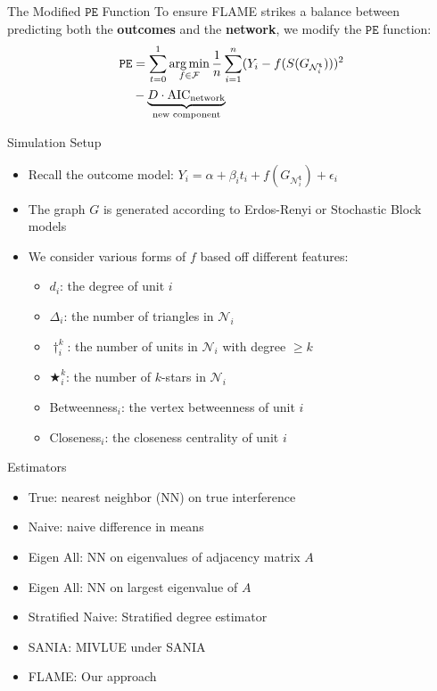 \documentclass[newPxFont,numfooter,sectionpages]{beamer}
\DeclareMathOperator*{\argmin}{arg\,min}
\newcommand{\bt}{\mathbf{t}}
\newcommand{\Gni}{G_{\mathcal{N}_i^\bt}}
\begin{document}
\begin{frame}{The Modified $\mathtt{PE}$ Function}
	To ensure FLAME strikes a balance between predicting both the \textbf{outcomes} and the \textbf{network}, we modify the $\mathtt{PE}$ function:
\begin{align*}
	{\tt PE} &= \sum_{t = 0}^1\argmin_{f \in \mathcal{F}}\frac{1}{n}\sum_{i = 1}^n(Y_i - f(S(\Gni)))^2\\
         &- \underbrace{D\cdot \text{AIC}_{\text{network}}}_{\text{new component}}
\end{align*}
\end{frame}

\begin{frame}{Simulation Setup}
	\begin{itemize}
		\item Recall the outcome model: $Y_i = \alpha + \beta_i t_i + f(G_{\mathcal{N}_i^\mathbf{t}}) + \epsilon_i$
		\item The graph $G$ is generated according to Erdos-Renyi or Stochastic Block models
		\item We consider various forms of $f$ based off different features:
		\begin{itemize}
			\item $d_i$: the degree of unit $i$
   			 \item $\Delta_i$: the number of triangles in $\mathcal{N}_i$
   			 \item $\dagger_i^k$: the number of units in $\mathcal{N}_i$ with degree $\geq k$
 			 \item $\bigstar_i^k$: the number of $k$-stars in $\mathcal{N}_i$
   			 \item Betweenness$_i$: the vertex betweenness of unit $i$
    			\item Closeness$_i$: the closeness centrality of unit $i$
		\end{itemize}
	\end{itemize}
\end{frame}
\begin{frame}{Estimators}
	\begin{itemize}
		\item True: nearest neighbor (NN) on true interference
		\item Naive: naive difference in means
		\item Eigen All: NN on eigenvalues of adjacency matrix $A$
		\item Eigen All: NN on largest eigenvalue of $A$	
		\item Stratified Naive: Stratified degree estimator 
		\item SANIA: MIVLUE under SANIA	
		\item FLAME: Our approach
	\end{itemize}
\end{frame}
\end{document}
